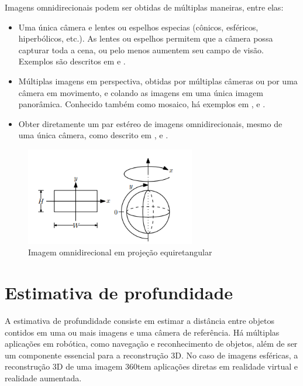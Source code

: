 \documentclass[cic,tc]{iiufrgs}
\begin{document}
Imagens omnidirecionais podem ser obtidas de múltiplas maneiras, entre elas:
\begin{itemize}
\item Uma única câmera e lentes ou espelhos especias (cônicos, esféricos, hiperbólicos, etc.). As lentes ou espelhos permitem que a câmera possa capturar toda a cena, ou pelo menos aumentem seu campo de visão. Exemplos são descritos em \citet{omniSingleCam1997} e \citet{omniSingleCam1998}.
\item Múltiplas imagens em perspectiva, obtidas por múltiplas câmeras ou por uma câmera em movimento, e colando as imagens em uma única imagem panorâmica. Conhecido também como mosaico, há exemplos em \citet{omniMultiCam1994}, \citet{omniMultiCam1996} e \citet{omniMultiCam1997}.
\item Obter diretamente um par estéreo de imagens omnidirecionais, mesmo de uma única câmera, como descrito em \citet{omniStereoCam1999}, \citep{omniStereoCam2013} e \citet{omniStereoCam2016}. 
\end{itemize}


\begin{figure}
    \caption{Imagem omnidirecional em projeção equiretangular}
    \begin{center}
        \includegraphics[width=20em]{equiretangular.png}
    \end{center}
    \label{fig:sphericalIm}
\end{figure}

\section{Estimativa de profundidade}

A estimativa de profundidade consiste em estimar
a distância entre objetos contidos em uma ou mais imagens e uma câmera de referência. Há múltiplas aplicações em robótica, como navegação e reconhecimento de objetos, além de ser um componente essencial para a reconstrução 3D. No caso de imagens esféricas, a reconstrução 3D de uma imagem 360\degree tem aplicações diretas em realidade virtual e realidade aumentada.
\end{document}
